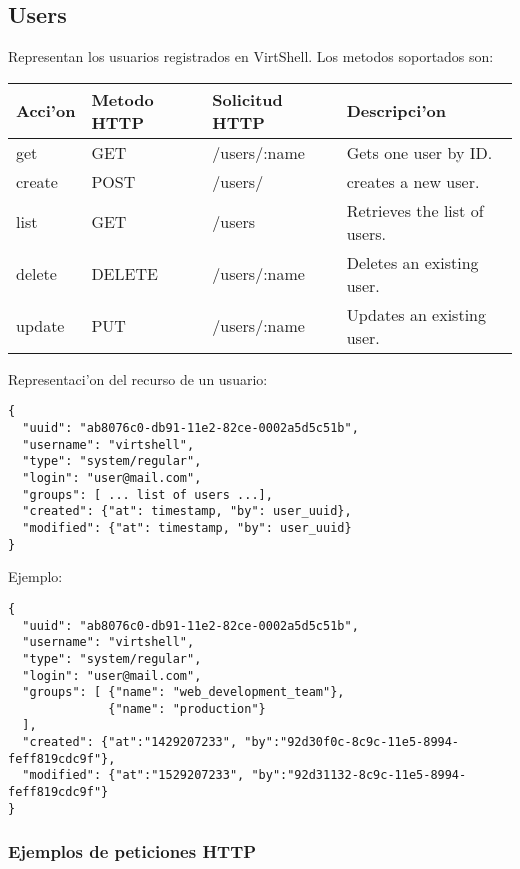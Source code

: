 \subsection{Users}
Representan los usuarios registrados en VirtShell. Los metodos soportados son:

\begin{center}
 \begin{tabular}{| l | l | l | l |}
 \hline
  \rowcolor{blueapi}
  \textbf{Acci'on} & \textbf{Metodo HTTP} & \textbf{Solicitud HTTP} & \textbf{Descripci'on} \\ [0.5ex] 
  \hline\hline
  get & GET & /users/:name & Gets one user by ID. \\
  \hline
  create & POST & /users/ & creates a new user. \\
  \hline
  list & GET & /users & Retrieves the list of users. \\  
  \hline
  delete & DELETE & /users/:name & Deletes an existing user. \\
  \hline  
  update & PUT & /users/:name & Updates an existing user. \\ [1ex]  
  \hline
\end{tabular}
\end{center}

\vspace{1cm}
Representaci'on del recurso de un usuario:
\vspace{1cm}

\begin{lstlisting}[style=json]
{
  "uuid": "ab8076c0-db91-11e2-82ce-0002a5d5c51b",
  "username": "virtshell",
  "type": "system/regular",
  "login": "user@mail.com",
  "groups": [ ... list of users ...],
  "created": {"at": timestamp, "by": user_uuid},
  "modified": {"at": timestamp, "by": user_uuid}
}
\end{lstlisting}

Ejemplo:

\medskip
\begin{lstlisting}[style=json]
{
  "uuid": "ab8076c0-db91-11e2-82ce-0002a5d5c51b",
  "username": "virtshell",
  "type": "system/regular",
  "login": "user@mail.com",
  "groups": [ {"name": "web_development_team"},
              {"name": "production"}
  ],
  "created": {"at":"1429207233", "by":"92d30f0c-8c9c-11e5-8994-feff819cdc9f"},
  "modified": {"at":"1529207233", "by":"92d31132-8c9c-11e5-8994-feff819cdc9f"}
}
\end{lstlisting}

\subsubsection{Ejemplos de peticiones HTTP}


